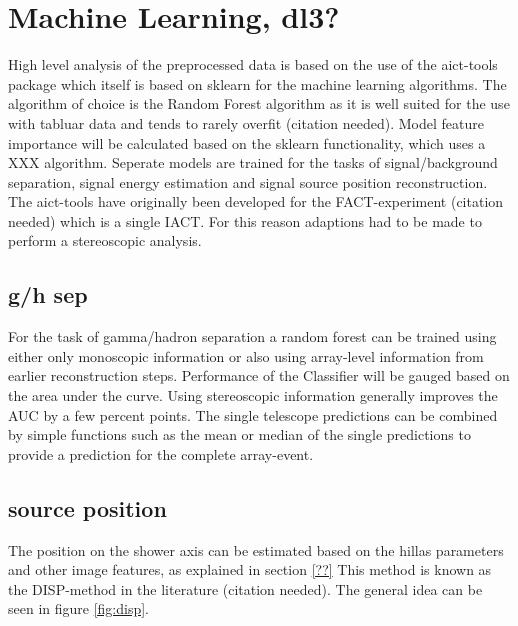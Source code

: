 \section{Machine Learning, dl3?}
High level analysis of the preprocessed data is based on the use of
the aict-tools \cite{aict-tools} package which itself is based on
sklearn \cite{sklearn_api} for the machine learning algorithms.
The algorithm of choice is the Random Forest algorithm
as it is well suited for the use with tabluar data and tends to rarely overfit
(citation needed).
Model feature importance will be calculated
based on the sklearn functionality, which
uses a XXX algorithm.
Seperate models are trained for the tasks of signal/background
separation, signal energy estimation and signal source position
reconstruction.
The aict-tools have originally been developed for the FACT-experiment
(citation needed) which is a single IACT. For this reason
adaptions had to be made to perform a stereoscopic analysis.



\subsection{g/h sep}
For the task of gamma/hadron separation a random forest can be trained
using either only monoscopic information or also using array-level
information from earlier reconstruction steps.
Performance of the Classifier will be gauged based 
on the area under the curve.
Using stereoscopic information
generally improves the AUC by a few percent points.
The single telescope predictions can be combined by
simple functions such as the mean or median of the
single predictions to provide a prediction for the complete
array-event.




\subsection{source position}
\label{sec:source_position}
The position on the shower axis can be estimated based on 
the hillas parameters and other image features, as 
explained in section \ref{??}
This method is known as the DISP-method in the
literature (citation needed). The general idea 
can be seen in figure \ref{fig:disp}.


